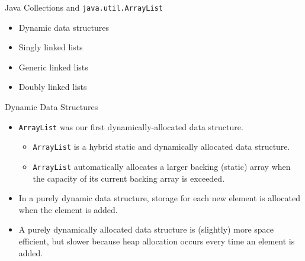\documentclass{beamer}
\author[Chris Simpkins] 
{Christopher Simpkins \\\texttt{chris.simpkins@gatech.edu}}
\institute[Georgia Tech] %
\date[CS 1331]{}
\begin{document}
\begin{frame}
  \titlepage
\end{frame}

\begin{frame}[fragile]{Java Collections and {\tt java.util.ArrayList}}

\begin{itemize}
\item Dynamic data structures
\item Singly linked lists
\item Generic linked lists
\item Doubly linked lists
\end{itemize}


\end{frame}

\begin{frame}[fragile]{Dynamic Data Structures}


\begin{itemize}
\item {\tt ArrayList} was our first dynamically-allocated data structure.
\begin{itemize}
\item {\tt ArrayList} is a hybrid static and dynamically allocated data structure.
\item {\tt ArrayList} automatically allocates a larger backing (static) array when the capacity of its current backing array is exceeded.
\end{itemize}
\item In a purely dynamic data structure, storage for each new element is allocated when the element is added.
\item A purely dynamically allocated data structure is (slightly) more space efficient, but slower because heap allocation occurs every time an element is added.
\end{itemize}


\end{frame}
\end{document}
